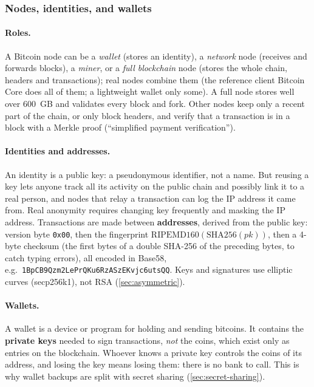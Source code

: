 \subsubsection{Nodes, identities, and wallets}

\paragraph{Roles.} A Bitcoin node can be a \emph{wallet} (stores an identity), a \emph{network} node (receives and forwards blocks), a \emph{miner}, or a \emph{full blockchain} node (stores the whole chain, headers and transactions); real nodes combine them (the reference client Bitcoin Core does all of them; a lightweight wallet only some). A full node stores well over 600~GB and validates every block and fork. Other nodes keep only a recent part of the chain, or only block headers, and verify that a transaction is in a block with a Merkle proof (\enquote{simplified payment verification}).

\paragraph{Identities and addresses.} An identity is a public key: a pseudonymous identifier, not a name. But reusing a key lets anyone track all its activity on the public chain and possibly link it to a real person, and nodes that relay a transaction can log the IP address it came from. Real anonymity requires changing key frequently and masking the IP address. Transactions are made between \textbf{addresses}, derived from the public key: version byte \texttt{0x00}, then the fingerprint $\mathrm{RIPEMD160}(\mathrm{SHA256}(\mathit{pk}))$, then a 4-byte checksum (the first bytes of a double SHA-256 of the preceding bytes, to catch typing errors), all encoded in Base58, e.g.\ \texttt{1BpCB9Qzm2LePrQKu6RzASzEKvjc6utsQQ}. Keys and signatures use elliptic curves (secp256k1), not RSA (\cref{sec:asymmetric}).

\paragraph{Wallets.} A wallet is a device or program for holding and sending bitcoins. It contains the \textbf{private keys} needed to sign transactions, \emph{not} the coins, which exist only as entries on the blockchain. Whoever knows a private key controls the coins of its address, and losing the key means losing them: there is no bank to call. This is why wallet backups are split with secret sharing (\cref{sec:secret-sharing}).

